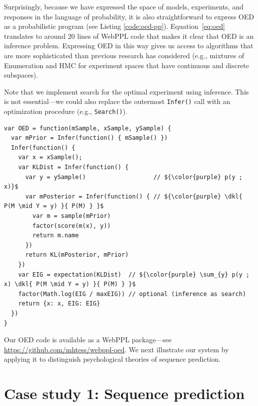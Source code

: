 \documentclass{article}
\newcommand{\dkl}{D_\mathrm{KL}\infdivx}
\begin{document}
Surprisingly, because we have expressed the space of models, experiments, and responses in the language of probability, it is also straightforward to express OED as a probabilistic program (see Listing \ref{code:oed-pp}).
Equation~\ref{eq:oed} translates to around 20 lines of WebPPL code that makes it clear that OED is an inference problem.
Expressing OED in this way gives us access to algorithms that are more sophisticated than previous research has considered  (e.g., mixtures of Enumeration and HMC for  experiment spaces that have continuous and discrete subspaces).

Note that we implement search for the optimal experiment using inference.
This is not essential---we could also replace the outermost \lstinline|Infer()| call with an optimization procedure (e.g., \lstinline|Search()|).

\begin{lstlisting}[mathescape, label={code:oed-pp}, caption = {OED implementation. For clarity, we have omitted some book-keeping details.}]
var OED = function(mSample, xSample, ySample) {
  var mPrior = Infer(function() { mSample() })
  Infer(function() {
    var x = xSample();
    var KLDist = Infer(function() {
      var y = ySample()                   // ${\color{purple} p(y ; x)}$
      var mPosterior = Infer(function() { // ${\color{purple} \dkl{ P(M \mid Y = y) }{ P(M) } }$
        var m = sample(mPrior)
        factor(score(m(x), y))
        return m.name
      })
      return KL(mPosterior, mPrior)
    })
    var EIG = expectation(KLDist)  // ${\color{purple} \sum_{y} p(y ; x) \dkl{ P(M \mid Y = y) }{ P(M) } }$
    factor(Math.log(EIG / maxEIG)) // optional (inference as search)
    return {x: x, EIG: EIG}
  })
}
\end{lstlisting}
Our OED code is available as a WebPPL package---see \url{https://github.com/mhtess/webppl-oed}.
We next illustrate our system by applying it to distinguish psychological theories of sequence prediction.

\section{Case study 1: Sequence prediction}
\label{s:tutorial}
\end{document}

